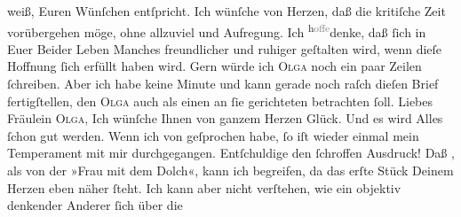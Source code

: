 \begin{ledgroupsized}[t]{13cm}
               weiß, Euren Wünſchen entſpricht. Ich wünſche von Herzen, daß die kritiſche Zeit
               vorübergehen möge, ohne  allzuviel \label{K_L03097-3v}\label{K_L03097-3h} und Aufregung. Ich \substVorne{}\textsuperscript{h\textcolor{gray}{offe}}\substDazwischen{}denke\substHinten{}, daß ſich in Euer Beider Leben Manches freundlicher {\pb}und ruhiger geſtalten wird, wenn dieſe Hoffnung ſich
               erfüllt haben wird. Gern würde ich \textsc{Olga} noch ein paar
               Zeilen ſchreiben. Aber ich habe keine Minute und kann gerade noch raſch dieſen Brief
               fertigſtellen, den \textsc{Olga} auch als einen an ſie gerichteten
               betrachten ſoll. Liebes Fräulein \textsc{Olga}, Ich wünſche Ihnen
               von ganzem Herzen Glück. Und es wird Alles ſchon gut werden.\pend
           \pstart
           Wenn ich von \label{K_L03097-4v}\label{K_L03097-4h} geſprochen habe, ſo iſt wieder einmal mein Temperament mit mir durchgegangen.
               Entſchuldige den ſchroffen {\pb}Ausdruck! Daß \label{K_L03097-5v}\label{K_L03097-5h}, als von der »Frau mit dem Dolch«, kann
               ich begreifen, da das erſte Stück Deinem Herzen eben näher ſteht. Ich kann aber nicht verſtehen, wie ein
               objektiv denkender  Anderer ſich über die

\end{ledgroupsized}
